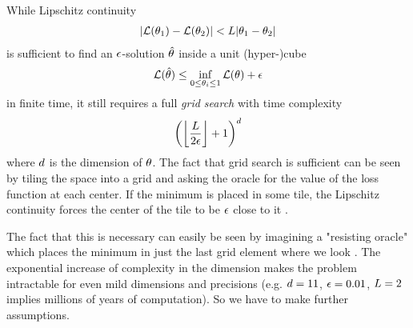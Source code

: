While Lipschitz continuity 
%
\begin{align*}
	| \mathcal{L}(\theta_1) - \mathcal{L}(\theta_2) | < L | \theta_1 - \theta_2 |
\end{align*}
%
is sufficient to find an \(\epsilon\)-solution \(\hat{\theta}\) inside a unit
(hyper-)cube
%
\begin{align*}
	\mathcal{L}(\hat{\theta}) \le \inf_{ 0\le\theta_i\le 1} \mathcal{L}(\theta) + \epsilon
\end{align*}
%
in finite time, it still requires a full \emph{grid search} with time complexity
%
\begin{align*}
	\left(\left\lfloor \frac{L}{2\epsilon}\right\rfloor + 1\right)^d
\end{align*}
%
where \(d\) is the dimension of \(\theta\). The fact that grid search is
sufficient can be seen by tiling the space into a grid and asking the oracle
for the value of the loss function at each center. If the minimum is placed in
some tile, the Lipschitz continuity forces the center of the tile to be \(\epsilon\)
close to it \parencite[cf.][p. 11]{nesterovLecturesConvexOptimization2018}.

The fact that this is necessary can easily be seen by imagining a "resisting
oracle" which places the minimum in just the last grid element where we look
\parencite[cf.][p. 13]{nesterovLecturesConvexOptimization2018}. The exponential
increase of complexity in the dimension makes the problem intractable for even
mild dimensions and precisions (e.g. \(d=11\), \(\epsilon=0.01\), \(L=2\)
implies millions of years of computation). So we have to make further
assumptions. 




\endinput
